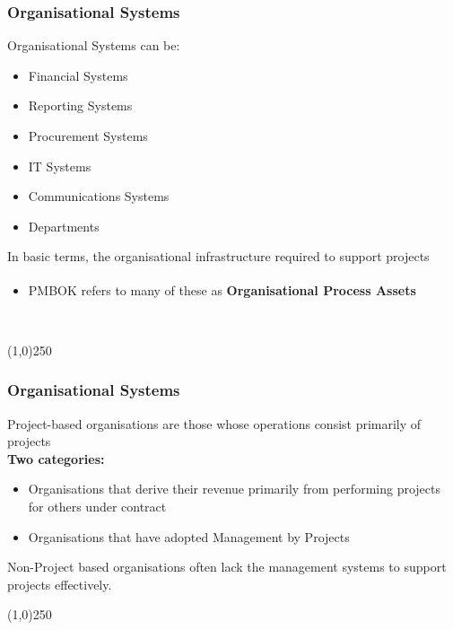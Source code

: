 \begin{frame}
\frametitle{Organisational Systems}
Organisational Systems can be:\\
\begin{itemize}
\item Financial Systems
\item Reporting Systems
\item Procurement Systems
\item IT Systems
\item Communications Systems
\item Departments
\end{itemize}
In basic terms, the organisational infrastructure required to support projects\\
\begin{itemize}
\item PMBOK\textsuperscript{\textregistered} refers to many of these as \textbf{Organisational Process Assets}\
\end{itemize}\
\end{frame}
\begin{center}\line(1,0){250}\end{center}



\begin{frame}
\frametitle{Organisational Systems}
Project-based organisations are those whose operations consist primarily of projects\\
\textbf{Two categories:}\\
\begin{itemize}
	\item Organisations that derive their revenue primarily from performing projects for others under contract
	\item Organisations that have adopted Management by Projects
\end{itemize}
Non-Project based organisations often lack the management systems to support projects effectively.\\
\end{frame}
\begin{center}\line(1,0){250}\end{center}



